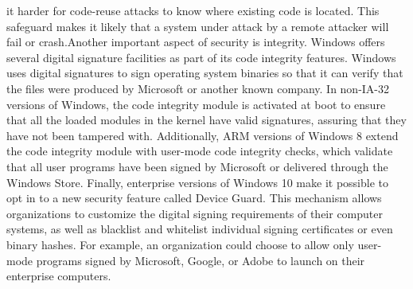 \documentclass[12pt]{article}
\begin{document}
it harder for code-reuse attacks to know where existing code is located. This
safeguard makes it likely that a system under attack by a remote attacker will
fail or crash.Another important aspect of security is integrity. Windows offers several
digital signature facilities as part of its code integrity features. Windows uses
digital signatures to sign operating system binaries so that it can verify that
the files were produced by Microsoft or another known company. In non-IA-32
versions of Windows, the code integrity module is activated at boot to ensure
that all the loaded modules in the kernel have valid signatures, assuring that
they have not been tampered with. Additionally, ARM versions of Windows 8
extend the code integrity module with user-mode code integrity checks, which
validate that all user programs have been signed by Microsoft or delivered
through the Windows Store. Finally, enterprise versions of Windows 10 make it possible to opt in to a
new security feature called Device Guard. This mechanism allows organizations
to customize the digital signing requirements of their computer systems,
as well as blacklist and whitelist individual signing certificates or even binary
hashes. For example, an organization could choose to allow only user-mode
programs signed by Microsoft, Google, or Adobe to launch on their enterprise
computers.
\end{document}
